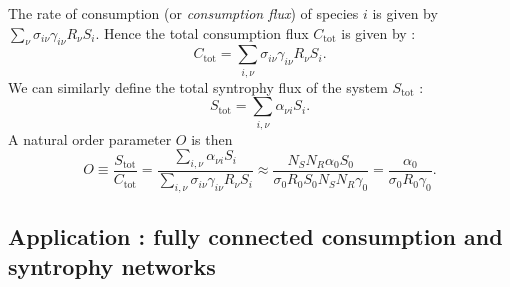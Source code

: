 \documentclass[12pt, titlepage]{report}
\begin{document}
The rate of consumption (or \textit{consumption flux}) of species $i$ is given by $\sum_\nu \sigma_{i\nu}\gamma_{i\nu}R_\nu S_i$. Hence the total consumption flux $C_{\text{tot}}$ is given by :
\begin{equation}
C_{\text{tot}} = \sum_{i, \nu} \sigma_{i\nu} \gamma_{i\nu}R_\nu S_i.
\end{equation}
We can similarly define the total syntrophy flux of the system $S_{\text{tot}}$ :
\begin{equation}
S_{\text{tot}} = \sum_{i, \nu} \alpha_{\nu i} S_i.
\end{equation}
A natural order parameter $O$ is then
\begin{equation}
O \equiv \frac{S_{\text{tot}}}{C_{\text{tot}}} = \frac{\sum_{i, \nu} \alpha_{\nu i} S_i}{\sum_{i,\nu}\sigma_{i\nu} \gamma_{i\nu}R_\nu S_i} \approx \frac{N_S N_R \alpha_0 S_0}{\sigma_0 R_0 S_0 N_S N_R \gamma_0} = \frac{\alpha_0}{\sigma_0 R_0 \gamma_0}.
\end{equation}

\subsection{Application : fully connected consumption and syntrophy networks}

\end{document}
